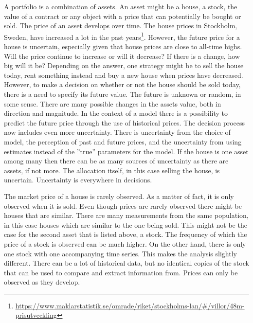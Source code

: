 A portfolio is a combination of assets.
An asset might be a house, a stock, the value of a contract or any object with a price that can potentially be bought or sold.
The price of an asset develops over time.
The house prices in Stockholm, Sweden, have increased a lot in the past years\footnote{\url{https://www.maklarstatistik.se/omrade/riket/stockholms-lan/\#/villor/48m-prisutveckling}}.
However, the future price for a house is uncertain, especially given that house prices are close to all-time highs.
Will the price continue to increase or will it decrease?
If there is a change, how big will it be?
Depending on the answer, one strategy might be to sell the house today, rent something instead and buy a new house when prices have decreased.
However, to make a decision on whether or not the house should be sold today, there is a need to specify its future value. 
The future is unknown or random, in some sense.
There are many possible changes in the assets value, both in direction and magnitude.
In the context of a model there is a possibility to predict the future price through the use of historical prices.
The decision process now includes even more uncertainty.
There is uncertainty from the choice of model, the perception of past and future prices, and the uncertainty from using estimates instead of the ''true'' parameters for the model.
If the house is one asset among many then there can be as many sources of uncertainty as there are assets, if not more.
The allocation itself, in this case selling the house, is uncertain.
Uncertainty is everywhere in decisions.

The market price of a house is rarely observed.
As a matter of fact, it is only observed when it is sold.
Even though prices are rarely observed there might be houses that are similar.
There are many measurements from the same population, in this case houses which are similar to the one being sold. 
This might not be the case for the second asset that is listed above, a stock.
The frequency of which the price of a stock is observed can be much higher.
On the other hand, there is only one stock with one accompanying time series.
This makes the analysis slightly different.
There can be a lot of historical data, but no identical copies of the stock that can be used to compare and extract information from.
Prices can only be observed as they develop.

